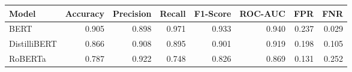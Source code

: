 \begin{tabular}{|l||r|r|r|r|r|r|r|}
\toprule
Model & \textbf{Accuracy} & \textbf{Precision} & Recall & \textbf{F1-Score} & \textbf{ROC-AUC} & \textbf{FPR} & FNR \\
\midrule \midrule
BERT & 0.905 & 0.898 & 0.971 & 0.933 & 0.940 & 0.237 & 0.029 \\
DistilliBERT & 0.866 & 0.908 & 0.895 & 0.901 & 0.919 & 0.198 & 0.105 \\
RoBERTa & 0.787 & 0.922 & 0.748 & 0.826 & 0.869 & 0.131 & 0.252 \\
\bottomrule
\end{tabular}
